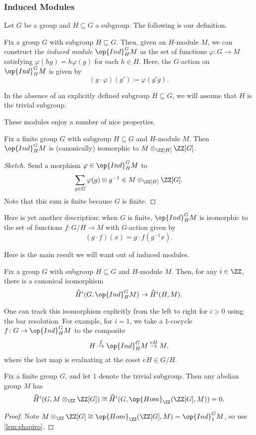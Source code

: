 \subsubsection{Induced Modules}
Let $G$ be a group and $H\subseteq G$ a subgroup. The following is our definition.
\begin{definition}
	Fix a group $G$ with subgroup $H\subseteq G$. Then, given an $H$-module $M$, we can construct the \textit{induced module} $\op{Ind}^G_HM$ as the set of functions $\varphi\colon G\to M$ satisfying $\varphi(hg)=h\varphi(g)$ for each $h\in H$. Here, the $G$-action on $\op{Ind}^G_HM$ is given by
	\[(g\cdot\varphi)(g')\coloneqq\varphi(g'g).\]
\end{definition}
\begin{remark}
	In the absence of an explicitly defined subgroup $H\subseteq G$, we will assume that $H$ is the trivial subgroup.
\end{remark}
These modules enjoy a number of nice properties.
\begin{lemma}
	Fix a finite group $G$ with subgroup $H\subseteq G$ and $H$-module $M$. Then $\op{Ind}^G_HM$ is (canonically) isomorphic to $M\otimes_{\ZZ[H]}\ZZ[G]$.
\end{lemma}
\begin{proof}[Sketch]
	Send a morphism $\varphi\in\op{Ind}^G_HM$ to
	\[\sum_{g\in G}\varphi(g)\otimes g^{-1}\in M\otimes_{\ZZ[H]}\ZZ[G].\]
	Note that this sum is finite because $G$ is finite.
\end{proof}
\begin{remark}
	Here is yet another description: when $G$ is finite, $\op{Ind}^G_HM$ is isomorphic to the set of functions $f\colon G/H\to M$ with $G$-action given by
	\[(g\cdot f)(x)=g\cdot f\left(g^{-1}x\right).\]
\end{remark}
Here is the main result we will want out of induced modules.
\begin{lemma} \label{lem:shapiro}
	Fix a group $G$ with subgroup $H\subseteq G$ and $H$-module $M$. Then, for any $i\in\ZZ$, there is a canonical isomorphism
	\[\widehat H^i(G,\op{Ind}^G_HM)\to\widehat H^i(H,M).\]
\end{lemma}
One can track this isomorphism explicitly from the left to right for $i>0$ using the bar resolution. For example, for $i=1$, we take a $1$-cocycle $f\colon G\to\op{Ind}^G_HM$ to the composite
\[H\stackrel f\to\op{Ind}^G_HM\stackrel{eH}\to M,\]
where the last map is evaluating at the coset $eH\in G/H$.
\begin{cor}
	Fix a finite group $G$, and let $1$ denote the trivial subgroup. Then any abelian group $M$ has
	\[\widehat H^i(G,M\otimes_\ZZ\ZZ[G])\cong\widehat H^i(G,\op{Hom}_\ZZ(\ZZ[G],M))=0.\]
\end{cor}
\begin{proof}
	Note $M\otimes_\ZZ\ZZ[G]\cong\op{Hom}_\ZZ(\ZZ[G],M)=\op{Ind}^G_1M$, so use \autoref{lem:shapiro}.
\end{proof}

